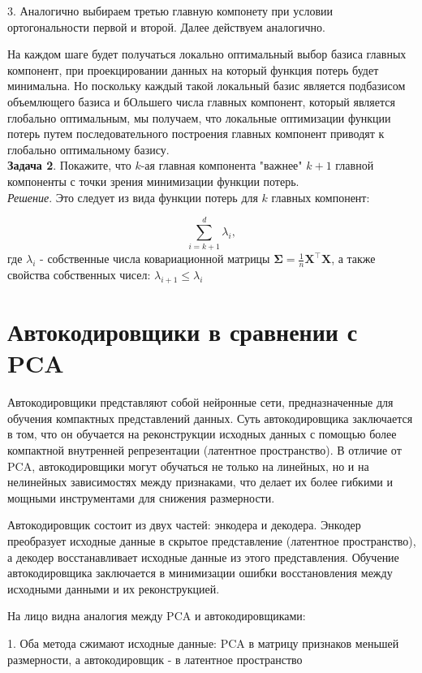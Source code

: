 3. Аналогично выбираем третью главную компонету при условии ортогональности первой и второй. Далее действуем аналогично.


На каждом шаге будет получаться локально оптимальный выбор базиса главных компонент, при проекцировании данных на который функция потерь будет минимальна. Но поскольку каждый такой локальный базис является подбазисом объемлющего базиса и бОльшего числа главных компонент, который является глобально оптимальным, мы получаем, что локальные оптимизации функции потерь путем последовательного построения главных компонент приводят к глобально оптимальному базису.\\

\textbf{Задача 2}. Покажите, что $k$-ая главная компонента "важнее"  $k+1$ главной компоненты с точки зрения минимизации функции потерь.\\

\textit{Решение}. Это следует из вида функции потерь для $k$ главных компонент:

\[
    \sum_{i=k+1}^d \lambda_i,
\]
где $\lambda_i$ - собственные числа ковариационной матрицы $\mathbf{\Sigma} = \frac{1}{n} \mathbf{X}^\top \mathbf{X}$, а также свойства собственных чисел: $ \lambda_{i+1} \leq \lambda_i$

\section{Автокодировщики в сравнении с PCA}

Автокодировщики представляют собой нейронные сети, предназначенные для обучения компактных представлений данных. Суть автокодировщика заключается в том, что он обучается на реконструкции исходных данных с помощью более компактной внутренней репрезентации (латентное пространство). В отличие от PCA, автокодировщики могут обучаться не только на линейных, но и на нелинейных зависимостях между признаками, что делает их более гибкими и мощными инструментами для снижения размерности.

Автокодировщик состоит из двух частей: энкодера и декодера. Энкодер преобразует исходные данные в скрытое представление (латентное пространство), а декодер восстанавливает исходные данные из этого представления. Обучение автокодировщика заключается в минимизации ошибки восстановления между исходными данными и их реконструкцией.

На лицо видна аналогия между PCA и автокодировщиками:

1. Оба метода сжимают исходные данные: PCA в матрицу признаков меньшей размерности, а автокодировщик - в латентное пространство

